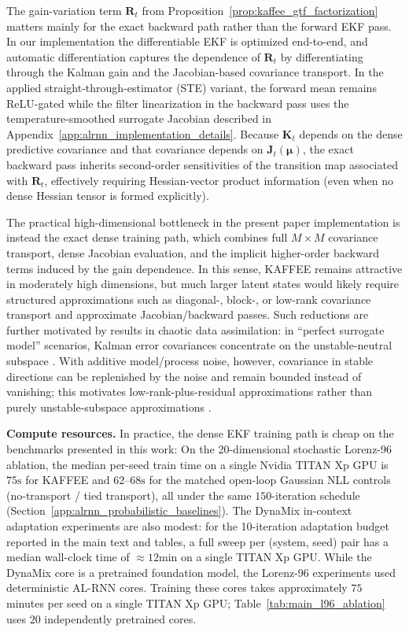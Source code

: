 \documentclass{article}
\theoremstyle{plain}
\theoremstyle{definition}
\theoremstyle{remark}
\begin{document}
The gain-variation term $\bm R_t$ from Proposition~\ref{prop:kaffee_gtf_factorization} matters mainly for the exact backward path rather than the forward EKF pass. In our implementation the differentiable EKF is optimized end-to-end, and automatic differentiation captures the dependence of $\bm R_t$ by differentiating through the Kalman gain and the Jacobian-based covariance transport. In the applied straight-through-estimator (STE) variant, the forward mean remains ReLU-gated while the filter linearization in the backward pass uses the temperature-smoothed surrogate Jacobian described in Appendix~\ref{app:alrnn_implementation_details}. Because $\bm K_t$ depends on the dense predictive covariance and that covariance depends on $\bm J_t(\bm \mu)$, the exact backward pass inherits second-order sensitivities of the transition map associated with $\bm R_t$, effectively requiring Hessian-vector product information (even when no dense Hessian tensor is formed explicitly). 
 
The practical high-dimensional bottleneck in the present paper implementation is instead the exact dense training path, which combines full $M\times M$ covariance transport, dense Jacobian evaluation, and the implicit higher-order backward terms induced by the gain dependence. In this sense, KAFFEE remains attractive in moderately high dimensions, but much larger latent states would likely require structured approximations such as diagonal-, block-, or low-rank covariance transport \cite{chang2022diagonal,chang2023lowrank,schmidt2023rankreduced} and approximate Jacobian/backward passes. Such reductions are further motivated by results in chaotic data assimilation: in ``perfect surrogate model'' scenarios, Kalman error covariances concentrate on the unstable-neutral subspace \citep{trevisan2011kalman,carrassi2022data}. With additive model/process noise, however, covariance in stable directions can be replenished by the noise and remain bounded instead of vanishing; this motivates low-rank-plus-residual approximations rather than purely unstable-subspace approximations \citep{grudzien2018chaotic}.

\textbf{Compute resources.} In practice, the dense EKF training path is cheap on the benchmarks presented in this work: On the 20-dimensional stochastic Lorenz-96 ablation, the median per-seed train time on a single Nvidia TITAN Xp GPU is $75\mathrm{s}$ for KAFFEE and $62$--$68\mathrm{s}$ for the matched open-loop Gaussian NLL controls (no-transport / tied transport), all under the same $150$-iteration schedule (Section~\ref{app:alrnn_probabilistic_baselines}). The DynaMix in-context adaptation experiments are also modest: for the 10-iteration adaptation budget reported in the main text and tables, a full sweep per (system, seed) pair has a median wall-clock time of $\approx 12\mathrm{min}$ on a single TITAN Xp GPU. While the DynaMix core is a pretrained foundation model, the Lorenz-96 experiments used deterministic AL-RNN cores. Training these cores takes approximately $75$ minutes per seed on a single TITAN Xp GPU; Table~\ref{tab:main_l96_ablation} uses $20$ independently pretrained cores.
\end{document}

